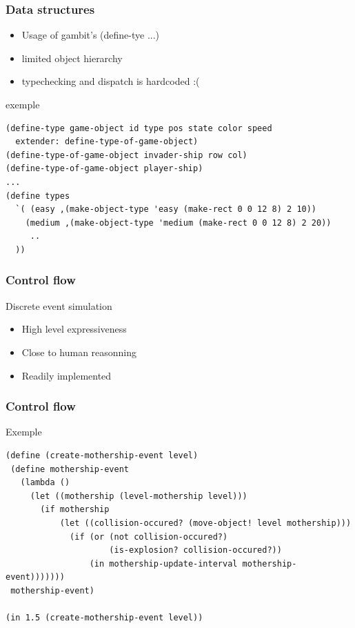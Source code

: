 \documentclass{beamer}
\newcommand{\<}[1]{\`#1}
\begin{document}
\begin{frame}[fragile]
  \frametitle{Data structures}

  \begin{block}{}
  \begin{itemize}
    \item Usage of gambit's (define-tye ...)
    \item limited object hierarchy
    \item typechecking and dispatch is \alert{hardcoded} :(
  \end{itemize}
  \end{block}

  \begin{block}{exemple}
    \begin{lstlisting}[basicstyle=\footnotesize]
(define-type game-object id type pos state color speed 
  extender: define-type-of-game-object)
(define-type-of-game-object invader-ship row col)
(define-type-of-game-object player-ship)
...
(define types
  `( (easy ,(make-object-type 'easy (make-rect 0 0 12 8) 2 10))
    (medium ,(make-object-type 'medium (make-rect 0 0 12 8) 2 20))
     ..
  ))
    \end{lstlisting}
  \end{block}

\end{frame}



\begin{frame}
  \frametitle{Control flow}
  \begin{block}{Discrete event simulation}
    \begin{itemize}
    \item High level expressiveness
    \item Close to human reasonning
    \item Readily implemented
    \end{itemize}
  \end{block}
\end{frame}

\begin{frame}[fragile]
  \frametitle{Control flow}
  \begin{block}{Exemple}
    \begin{lstlisting}[basicstyle=\footnotesize]
(define (create-mothership-event level)
 (define mothership-event
   (lambda ()
     (let ((mothership (level-mothership level)))
       (if mothership
           (let ((collision-occured? (move-object! level mothership)))
             (if (or (not collision-occured?)
                     (is-explosion? collision-occured?))
                 (in mothership-update-interval mothership-event)))))))
 mothership-event)

(in 1.5 (create-mothership-event level))
    \end{lstlisting}
  \end{block}
\end{frame}
\end{document}
